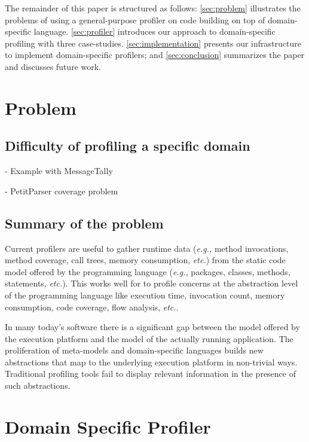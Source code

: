 \documentclass[runningheads]{llncs}
\newcommand{\eg}{\emph{e.g.,}\xspace}
\newcommand{\etc}{\emph{etc.}\xspace}
\newcommand{\seclabel}[1]{\label{sec:#1}}
\begin{document}
The remainder of this paper is structured as follows: \autoref{sec:problem} illustrates the problems of using a general-purpose profiler on code building on top of domain-specific language. \autoref{sec:profiler} introduces our approach to domain-specific profiling with three case-studies. \autoref{sec:implementation} presents our infrastructure to implement domain-specific profilers; and \autoref{sec:conclusion} summarizes the paper and discusses future work.

\section{Problem}\seclabel{problem}

\subsection{Difficulty of profiling a specific domain}

- Example with MessageTally

- PetitParser coverage problem

\subsection{Summary of the problem}

Current profilers are useful to gather runtime data (\eg method invocations, method coverage, call trees, memory consumption, \etc) from the static code model offered by the programming language (\eg packages, classes, methods, statements, \etc). This works well for to profile concerns at the abstraction level of the programming language like execution time, invocation count, memory consumption, code coverage, flow analysis, \etc.

In many today's software there is a significant gap between the model offered by the execution platform and the model of the actually running application. The proliferation of meta-models and domain-specific languages builds new abstractions that map to the underlying execution platform in non-trivial ways. Traditional profiling tools fail to display relevant information in the presence of such abstractions.


\section{Domain Specific Profiler}\seclabel{profiler}
\end{document}
